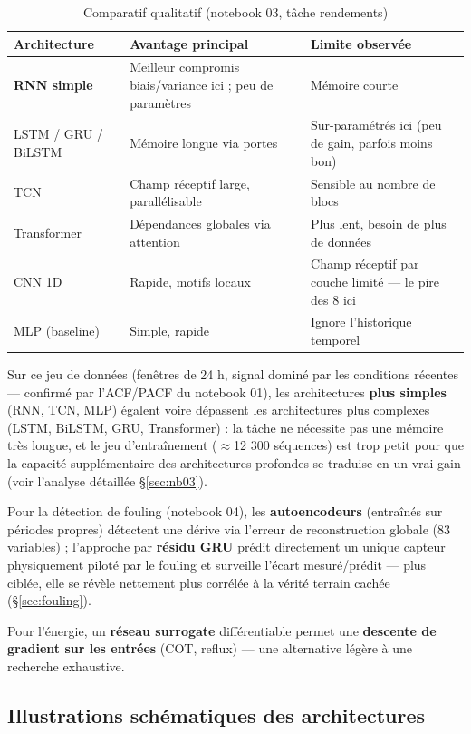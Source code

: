 \documentclass[11pt]{article}
\begin{document}
\begin{table}[h]
\centering
\begin{tabular}{p{3cm}p{5.5cm}p{5.5cm}}
\toprule
Architecture & Avantage principal & Limite observée \\
\midrule
\textbf{RNN simple} & Meilleur compromis biais/variance ici ; peu de paramètres & Mémoire courte \\
LSTM / GRU / BiLSTM & Mémoire longue via portes & Sur-paramétrés ici (peu de gain, parfois moins bon) \\
TCN & Champ réceptif large, parallélisable & Sensible au nombre de blocs \\
Transformer & Dépendances globales via attention & Plus lent, besoin de plus de données \\
CNN 1D & Rapide, motifs locaux & Champ réceptif par couche limité — le pire des 8 ici \\
MLP (baseline) & Simple, rapide & Ignore l'historique temporel \\
\bottomrule
\end{tabular}
\caption{Comparatif qualitatif (notebook 03, tâche rendements)}
\end{table}

Sur ce jeu de données (fenêtres de 24 h, signal dominé par les conditions récentes — confirmé
par l'ACF/PACF du notebook 01), les architectures \textbf{plus simples} (RNN, TCN, MLP) égalent
voire dépassent les architectures plus complexes (LSTM, BiLSTM, GRU, Transformer) : la tâche ne
nécessite pas une mémoire très longue, et le jeu d'entraînement ($\approx$12 300 séquences) est
trop petit pour que la capacité supplémentaire des architectures profondes se traduise en un
vrai gain (voir l'analyse détaillée §\ref{sec:nb03}).

Pour la détection de fouling (notebook 04), les \textbf{autoencodeurs} (entraînés sur périodes
propres) détectent une dérive via l'erreur de reconstruction globale (83 variables) ; l'approche
par \textbf{résidu GRU} prédit directement un unique capteur physiquement piloté par le fouling
et surveille l'écart mesuré/prédit — plus ciblée, elle se révèle nettement plus corrélée à la
vérité terrain cachée (§\ref{sec:fouling}).

Pour l'énergie, un \textbf{réseau surrogate} différentiable permet une \textbf{descente de
gradient sur les entrées} (COT, reflux) — une alternative légère à une recherche exhaustive.

\subsection*{Illustrations schématiques des architectures}
\end{document}
